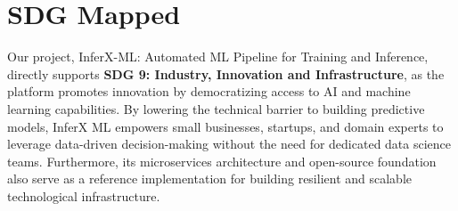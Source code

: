 \newpage
\section{SDG Mapped}
\hspace{0.5cm}Our project, InferX-ML: Automated ML Pipeline for Training and Inference, directly supports \textbf{SDG 9: Industry, Innovation and Infrastructure}, as the platform promotes innovation by democratizing access to AI and machine learning capabilities. By lowering the technical barrier to building predictive models, InferX ML empowers small businesses, startups, and domain experts to leverage data-driven decision-making without the need for dedicated data science teams. Furthermore, its microservices architecture and open-source foundation also serve as a reference implementation for building resilient and scalable technological infrastructure.\vspace{0.3cm}


